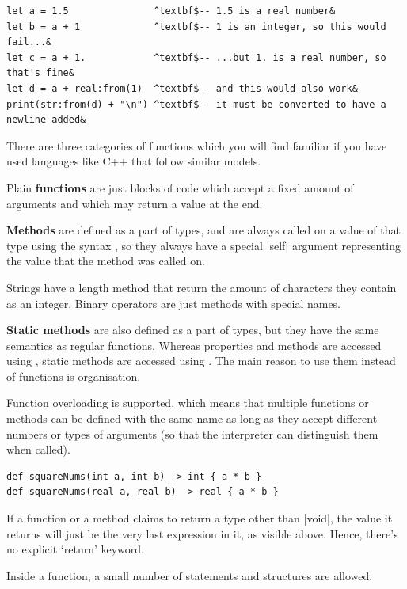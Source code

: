 \documentclass[11pt]{report}
\begin{document}
\begin{Verbatim}[commandchars=^$&]
let a = 1.5               ^textbf$-- 1.5 is a real number&
let b = a + 1             ^textbf$-- 1 is an integer, so this would fail...&
let c = a + 1.            ^textbf$-- ...but 1. is a real number, so that's fine&
let d = a + real:from(1)  ^textbf$-- and this would also work&
print(str:from(d) + "\n") ^textbf$-- it must be converted to have a newline added&
\end{Verbatim}

There are three categories of functions which you will find familiar if you have used languages like C++ that follow similar models.

Plain \textbf{functions} are just blocks of code which accept a fixed amount of arguments and which may return a value at the end.

\textbf{Methods} are defined as a part of types, and are always called on a value of that type using the syntax , so they always have a special |self| argument representing the value that the method was called on.

Strings have a length method that return the amount of characters they contain as an integer. Binary operators are just methods with special names.

\textbf{Static methods} are also defined as a part of types, but they have the same semantics as regular functions. Whereas properties and methods are accessed using , static methods are accessed using . The main reason to use them instead of functions is organisation.

Function overloading is supported, which means that multiple functions or methods can be defined with the same name as long as they accept different numbers or types of arguments (so that the interpreter can distinguish them when called).

\begin{Verbatim}
def squareNums(int a, int b) -> int { a * b }
def squareNums(real a, real b) -> real { a * b }
\end{Verbatim}

If a function or a method claims to return a type other than |void|, the value it returns will just be the very last expression in it, as visible above. Hence, there's no explicit `return' keyword.

Inside a function, a small number of statements and structures are allowed.
\end{document}

